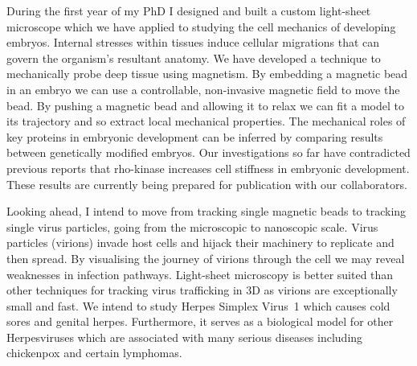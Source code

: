 During the first year of my PhD I designed and built a custom light-sheet microscope which we have applied to studying the cell mechanics of developing embryos.
Internal stresses within tissues induce cellular migrations that can govern the organism's resultant anatomy.
We have developed a technique to mechanically probe deep tissue using magnetism.
By embedding a magnetic bead in an embryo we can use a controllable, non-invasive magnetic field to move the bead.
By pushing a magnetic bead and allowing it to relax we can fit a model to its trajectory and so extract local mechanical properties.
The mechanical roles of key proteins in embryonic development can be inferred by comparing results between genetically modified embryos.
Our investigations so far have contradicted previous reports that rho-kinase increases cell stiffness in embryonic development. These results are currently being prepared for publication with our collaborators.

Looking ahead, I intend to move from tracking single magnetic beads to tracking single virus particles, going from the microscopic to nanoscopic scale.
Virus particles (virions) invade host cells and hijack their machinery to replicate and then spread. %
By visualising the journey of virions through the cell we may reveal weaknesses in infection pathways.
Light-sheet microscopy is better suited than other techniques for tracking virus trafficking in 3D as virions are exceptionally small and fast.
We intend to study Herpes Simplex Virus~1 which causes cold sores and genital herpes.
Furthermore, it serves as a biological model for other Herpesviruses which are associated with many serious diseases including chickenpox and certain lymphomas.

